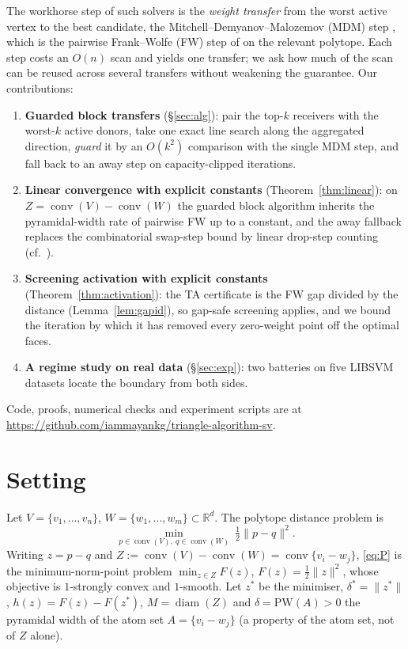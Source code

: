 \documentclass{opt2026}   %
\newcommand{\conv}{\operatorname{conv}}
\newcommand{\PW}{\mathrm{PW}}
\newcommand{\norm}[1]{\lVert #1 \rVert}
\newcommand{\R}{\mathbb{R}}
\begin{document}
The workhorse step of such solvers is the \emph{weight transfer} from
the worst active vertex to the best candidate, the
Mitchell--Demyanov--Malozemov (MDM) step \cite{mdm1974}, which is the
pairwise Frank--Wolfe (FW) step of \cite{lj2015} on the relevant
polytope. Each step costs an $O(n)$ scan and yields one transfer; we ask how much
of the scan can be reused across several transfers without weakening
the guarantee. Our contributions:

\begin{enumerate}\setlength\itemsep{0pt}
\item \textbf{Guarded block transfers} (\S\ref{sec:alg}): pair the top-$k$
receivers with the worst-$k$ active donors, take one exact line search
along the aggregated direction, \emph{guard} it by an $O(k^2)$
comparison with the single MDM step, and fall back to an away step on
capacity-clipped iterations.
\item \textbf{Linear convergence with explicit constants}
(Theorem~\ref{thm:linear}): on $Z=\conv(V)-\conv(W)$ the guarded block
algorithm inherits the pyramidal-width rate of pairwise FW up to a
constant, and the away fallback replaces the combinatorial swap-step
bound by linear drop-step counting (cf.\ \cite{tsuji2022}).
\item \textbf{Screening activation with explicit constants}
(Theorem~\ref{thm:activation}): the TA certificate is the FW gap divided
by the distance (Lemma~\ref{lem:gapid}), so gap-safe screening
\cite{ndiaye2017} applies, and we bound the iteration by which it has
removed every zero-weight point off the optimal faces.
\item \textbf{A regime study on real data} (\S\ref{sec:exp}): two
batteries on five LIBSVM datasets locate the boundary from both sides.
\end{enumerate}
Code, proofs, numerical checks and experiment scripts are at
\url{https://github.com/iammayankg/triangle-algorithm-sv}.

\section{Setting}\label{sec:setting}

Let $V=\{v_1,\dots,v_n\}$, $W=\{w_1,\dots,w_m\}\subset\R^d$. The
polytope distance problem is
\begin{equation}\label{eq:P}
  \min_{p\in\conv(V),\ q\in\conv(W)} \ \tfrac12\norm{p-q}^2 .
\end{equation}
Writing $z=p-q$ and $Z:=\conv(V)-\conv(W)=\conv\{v_i-w_j\}$,
\eqref{eq:P} is the minimum-norm-point problem $\min_{z\in Z}F(z)$,
$F(z)=\tfrac12\norm z^2$, whose objective is $1$-strongly convex and
$1$-smooth. Let $z^*$ be the minimiser, $\delta^*=\norm{z^*}$,
$h(z)=F(z)-F(z^*)$, $M=\operatorname{diam}(Z)$ and
$\delta=\PW(A)>0$ the pyramidal width \cite{lj2015} of the atom set
$A=\{v_i-w_j\}$ (a property of the atom set, not of $Z$ alone).
\end{document}
